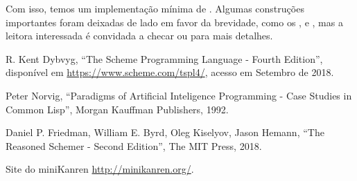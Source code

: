 \documentclass{article}
\begin{document}
  Com isso, temos um implementação mínima de
  . Algumas construções importantes foram
  deixadas de lado em favor da brevidade, como os
  ,  e ,
  mas a leitora interessada é convidada a checar \cite{will} ou
  \cite{kanren} para mais detalhes.
  
  

    
  \begin{thebibliography}{1}

   R. Kent Dybvyg,
    ``The Scheme Programming Language - Fourth Edition'',
    disponível em \url{https://www.scheme.com/tspl4/}, acesso em
    Setembro de 2018.

   Peter Norvig,
    ``Paradigms of Artificial Inteligence Programming - Case Studies
    in Common Lisp'',
    Morgan Kauffman Publishers, 1992.

     Daniel P. Friedman, William E. Byrd, Oleg Kiselyov,
      Jason Hemann,
      ``The Reasoned Schemer - Second Edition'',
      The MIT Press, 2018.

       Site do miniKanren \url{http://minikanren.org/}.
      
  \end{thebibliography}
\end{document}
